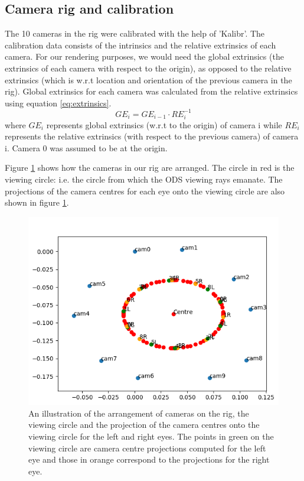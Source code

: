 \documentclass[10pt,twocolumn,letterpaper]{article}
\begin{document}
\subsection{Camera rig and calibration}
\label{sec:camera-rig}
The 10 cameras in the rig were calibrated with the help of 'Kalibr'. The calibration data consists of the intrinsics and the relative extrinsics of each camera. For our rendering purposes, we would need the global extrinsics (the extrinsics of each camera with respect to the origin), as opposed to the relative extrinsics (which is w.r.t location and orientation of the previous camera in the rig). Global extrinsics for each camera was calculated from the relative extrinsics using equation \ref{eq:extrinsics}. 
\begin{equation}
GE_i = GE_{i-1} \cdot RE_{i}^{-1}
\label{eq:extrinsics}
\end{equation}
where $GE_i$ represents global extrinsics (w.r.t to the origin) of camera i while $RE_i$ represents the relative extrinsics (with respect to the previous camera) of camera i. Camera 0 was assumed to be at the origin.

Figure \ref{fig:rig} shows how the cameras in our rig are arranged. The circle in red is the viewing circle: i.e. the circle from which the ODS viewing rays emanate. The projections of the camera centres for each eye onto the viewing circle are also shown in figure \ref{fig:rig}. 

\begin{figure}[t]
\begin{center}
   \includegraphics[width=0.8\linewidth]{pictures/our_camera_rig.PNG}
\end{center}
   \caption{An illustration of the arrangement of cameras on the rig, the viewing circle and the projection of the camera centres onto the viewing circle for the left and right eyes. The points in green on the viewing circle are camera centre projections computed for the left eye and those in orange correspond to the projections for the right eye.}
\label{fig:rig}
\end{figure}
\end{document}
